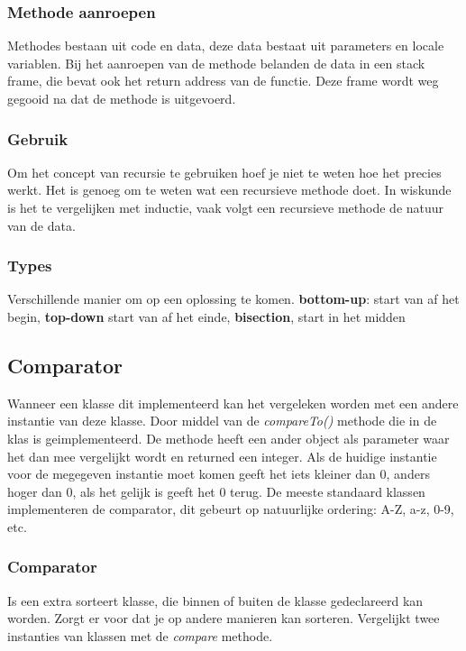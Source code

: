 \subsubsection{Methode aanroepen}
Methodes bestaan uit code en data, deze data bestaat uit parameters en locale variablen.
Bij het aanroepen van de methode belanden de data in een stack frame, die bevat ook het return address van de functie.
Deze frame wordt weg gegooid na dat de methode is uitgevoerd.

\subsubsection{Gebruik}
Om het concept van recursie te gebruiken hoef je niet te weten hoe het precies werkt.
Het is genoeg om te weten wat een recursieve methode doet.
In wiskunde is het te vergelijken met inductie, vaak volgt een recursieve methode de natuur van de data.

\subsubsection{Types}
Verschillende manier om op een oplossing te komen.
\textbf{bottom-up}: start van af het begin, \textbf{top-down} start van af het einde, \textbf{bisection}, start in het midden

\subsection{Comparator}
Wanneer een klasse dit implementeerd kan het vergeleken worden met een andere instantie van deze klasse.
Door middel van de \textit{compareTo()} methode die in de klas is geimplementeerd. 
De methode heeft een ander object als parameter waar het dan mee vergelijkt wordt en returned een integer.
Als de huidige instantie voor de megegeven instantie moet komen geeft het iets kleiner dan 0, anders hoger dan 0, als het gelijk is geeft het 0 terug.
De meeste standaard klassen implementeren de comparator, dit gebeurt op natuurlijke ordering: A-Z, a-z, 0-9, etc.

\subsubsection{Comparator}
Is een extra sorteert klasse, die binnen of buiten de klasse gedeclareerd kan worden.
Zorgt er voor dat je op andere manieren kan sorteren.
Vergelijkt twee instanties van klassen met de \textit{compare} methode.


